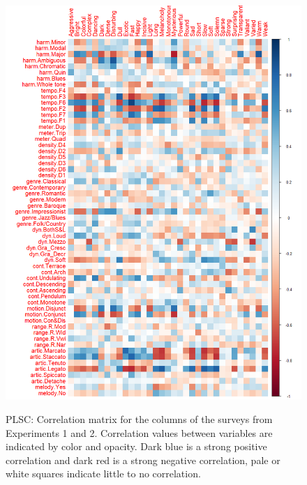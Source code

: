 \documentclass[
]{article}
\begin{document}
\begin{figure}   
  \centering  
  \caption{PLSC: Correlation matrix for the columns of the surveys from Experiments 1 and 2. Correlation values between variables are indicated by color and opacity. Dark blue is a strong positive correlation and dark red is a strong negative correlation, pale or white squares indicate little to no correlation.}
    \includegraphics[width=\textwidth]{./supmatsimgs/pcorrplot.png}
  \label{fig:pcorr}
\end{figure}
\end{document}

